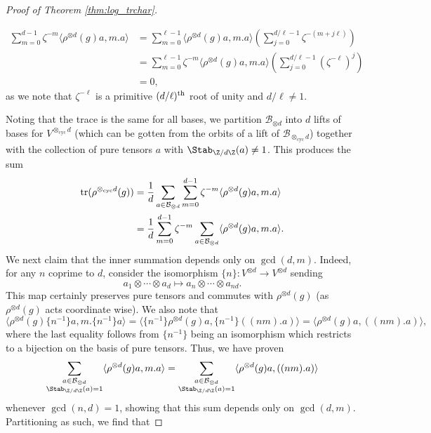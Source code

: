 \documentclass[12pt]{amsart}
\theoremstyle{plain}
\begin{document}
\begin{proof}[Proof of Theorem \ref{thm:log_trchar}]
\begin{enumerate}
{    \begin{align*}
    \sum_{m=0}^{d-1} \zeta^{-m}\langle \rho^{\otimes d}(g)a,m.a\rangle &= \sum_{m=0}^{\ell-1}\langle \rho^{\otimes d}(g)a,m.a\rangle \left(\sum_{j=0}^{d/\ell - 1} \zeta^{-(m+j\ell)}\right)\\
    &=\sum_{m=0}^{\ell-1}\zeta^{-m}\langle \rho^{\otimes d}(g)a,m.a\rangle \left(\sum_{j=0}^{d/\ell - 1} (\zeta^{-\ell})^j\right)\\
    &= 0,
    \end{align*}
    as we note that $\zeta^{-\ell}$ is a primitive $(d/\ell)^{\rm th}$ root of unity and $d/\ell\ne 1$.}
\end{enumerate}

Noting that the trace is the same for all bases, we partition $\mathcal{B}_{\otimes d}$ into $d$ lifts of bases for $V^{\otimes_{\text{cyc}} d}$ (which can be gotten from the orbits of a lift of $\mathcal{B}_{\otimes_{\text{cyc}}d}$) together with the collection of pure tensors $a$ with $\Stab_{\Z/d\Z}(a)\ne 1$. This produces the sum
\begin{align*}
{\rm tr}(\rho^{\otimes_{\rm cyc} d}(g))&=\frac{1}{d}\sum_{a\in\mathcal{B}_{\otimes d}}\sum_{m=0}^{d-1} \zeta^{-m} \langle\rho^{\otimes d}(g)a,m.a\rangle\\
&=\frac{1}{d}\sum_{m=0}^{d-1}\zeta^{-m} \sum_{a\in\mathcal{B}_{\otimes d}} \langle\rho^{\otimes d}(g)a,m.a\rangle.
\end{align*}
We next claim that the inner summation depends only on $\gcd(d,m)$. Indeed, for any $n$ coprime to $d$, consider the isomorphism $\{n\}:V^{\otimes d} \to V^{\otimes d}$ sending
\[
a_1\otimes \cdots \otimes a_d\mapsto a_n\otimes \cdots \otimes a_{nd}.
\]
This map certainly preserves pure tensors and commutes with $\rho^{\otimes d}(g)$ (as $\rho^{\otimes d}(g)$ acts coordinate wise). We also note that
\[
\langle \rho^{\otimes d}(g)\{n^{-1}\}a,m.\{n^{-1}\}a\rangle = \langle\{n^{-1}\} \rho^{\otimes d}(g)a,\{n^{-1}\}((nm).a)\rangle = \langle\rho^{\otimes d}(g)a,((nm).a)\rangle,
\]
where the last equality follows from $\{n^{-1}\}$ being an isomorphism which restricts to a bijection on the basis of pure tensors. Thus, we have proven
\[
\sum_{\substack{a\in\mathcal{B}_{\otimes d}\\\Stab_{\Z/d\Z}(a)=1}} \langle\rho^{\otimes d}(g)a,m.a\rangle = \sum_{\substack{a\in\mathcal{B}_{\otimes d}\\\Stab_{\Z/d\Z}(a)=1}} \langle\rho^{\otimes d}(g)a,((nm).a)\rangle
\]
whenever $\gcd(n,d)=1$, showing that this sum depends only on $\gcd(d,m)$. Partitioning as such, we find that

\end{proof}
\end{document}
